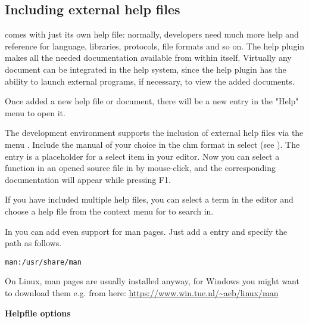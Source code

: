 

\subsection{Including external help files}

\codeblocks comes with just its own help file: normally, developers need much more help and reference for language, libraries, protocols, file formats and so on. The help plugin makes all the needed documentation available from within \codeblocks itself. Virtually any document can be integrated in the \codeblocks help system, since the help plugin has the ability to launch external programs, if necessary, to view the added documents.

Once added a new help file or document, there will be a new entry in the "Help" menu to open it.
 
The \codeblocks development environment supports the inclusion of external help files via the menu . Include the manual of your choice in the chm format in  select  (see ). The entry  is a placeholder for a select item in your editor. Now you can select a function in an opened source file in \codeblocks by mouse-click, and the corresponding documentation will appear while pressing F1.

If you have included multiple help files, you can select a term in the editor and choose a help file from the context menu  for \codeblocks to search in.


In \codeblocks you can add even support for man pages. Just add a entry  and specify the path as follows.

\begin{lstlisting}
man:/usr/share/man
\end{lstlisting}

On Linux, man pages are usually installed anyway, for Windows you might want to download them e.g. from here: \url{https://www.win.tue.nl/~aeb/linux/man}

\textbf{Helpfile options}

